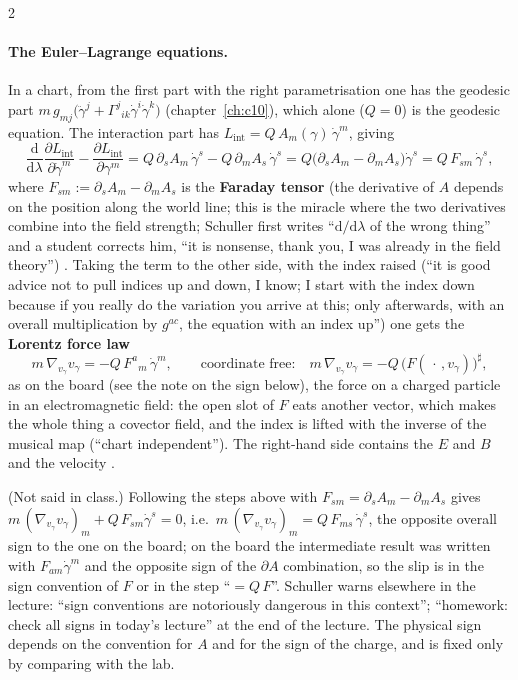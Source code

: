 \begin{paracol}{2}
\paragraph{The Euler--Lagrange equations.} In a chart, from the first part with the right parametrisation one has the geodesic part $m\,g_{mj}\bigl(\ddot\gamma^j+\Gamma^j{}_{ik}\dot\gamma^i\dot\gamma^k\bigr)$ (chapter~\ref{ch:c10}), which alone ($Q=0$) is the geodesic equation. The interaction part has $L_{\mathrm{int}}=Q\,A_m(\gamma)\,\dot\gamma^m$, giving
\[
  \frac{\mathrm d}{\mathrm d\lambda}\frac{\partial L_{\mathrm{int}}}{\partial\dot\gamma^m}-\frac{\partial L_{\mathrm{int}}}{\partial\gamma^m}
  =Q\,\partial_sA_m\,\dot\gamma^s-Q\,\partial_mA_s\,\dot\gamma^s
  =Q\bigl(\partial_sA_m-\partial_mA_s\bigr)\dot\gamma^s=Q\,F_{sm}\,\dot\gamma^s,
\]
where $F_{sm}:=\partial_sA_m-\partial_mA_s$ is the \textbf{Faraday tensor} (the derivative of $A$ depends on the position along the world line; this is the miracle where the two derivatives combine into the field strength; Schuller first writes ``$\mathrm d/\mathrm d\lambda$ of the wrong thing'' and a student corrects him, ``it is nonsense, thank you, I was already in the field theory'') .
Taking the term to the other side, with the index raised (``it is good advice not to pull indices up and down, I know; I start with the index down because if you really do the variation you arrive at this; only afterwards, with an overall multiplication by $g^{ac}$, the equation with an index up'') one gets the \textbf{Lorentz force law}
\[
  m\,\nabla_{v_\gamma}v_\gamma=-Q\,F^{a}{}_{m}\,\dot\gamma^m,\qquad\text{coordinate free:}\quad m\,\nabla_{v_\gamma}v_\gamma=-Q\,\bigl(F(\,\cdot\,,v_\gamma)\bigr)^\sharp,
\]
as on the board (see the note on the sign below), the force on a charged particle in an electromagnetic field: the open slot of $F$ eats another vector, which makes the whole thing a covector field, and the index is lifted with the inverse of the musical map (``chart independent''). The right-hand side contains the $E$ and $B$ and the velocity .
\begin{coursenote}
(Not said in class.) Following the steps above with $F_{sm}=\partial_sA_m-\partial_mA_s$ gives $m\,(\nabla_{v_\gamma}v_\gamma)_m+Q\,F_{sm}\dot\gamma^s=0$, i.e.\ $m\,(\nabla_{v_\gamma}v_\gamma)_m=Q\,F_{ms}\,\dot\gamma^s$, the opposite overall sign to the one on the board; on the board the intermediate result was written with $F_{am}\dot\gamma^m$ and the opposite sign of the $\partial A$ combination, so the slip is in the sign convention of $F$ or in the step ``$=Q\,F$''. Schuller warns elsewhere in the lecture: ``sign conventions are notoriously dangerous in this context''; ``homework: check all signs in today's lecture'' at the end of the lecture. The physical sign depends on the convention for $A$ and for the sign of the charge, and is fixed only by comparing with the lab.

\end{coursenote}
\end{paracol}
